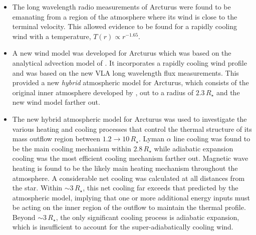 \begin{itemize}
	\item The long wavelength radio measurements of Arcturus were found to be emanating from a region of the atmosphere where its wind is close to the terminal velocity. This allowed evidence to be found for a rapidly cooling wind with a temperature, $T(r) \propto r^{−1.65}$.
	
	\item A new wind model was developed for Arcturus which was based on the analytical advection model of \cite{glassgold_1986}. It incorporates a rapidly cooling wind profile and was based on the new VLA long wavelength flux measurements. This provided a new \textit{hybrid} atmospheric model for Arcturus, which consists of the original inner atmosphere developed by \cite{drake_1985}, out to a radius of $2.3\,R_{\star}$ and the new wind model farther out.

	\item The new hybrid atmospheric model for Arcturus was used to investigate the various heating and cooling processes that control the thermal structure of its mass outflow region between $1.2\rightarrow  10\,R_{\star}$. Lyman $\alpha$ line cooling was found to be the main cooling mechanism within $2.8\,R_{\star}$ while adiabatic expansion cooling was the most efficient cooling mechanism farther out. Magnetic wave heating is found to be the likely main heating mechanism throughout the atmosphere. A considerable net cooling was calculated at all distances from the star. Within $\sim 3\,R_{\star}$, this net cooling far exceeds that predicted by the atmospheric model, implying that one or more additional energy inputs must be acting on the inner region of the outflow to maintain the thermal profile. Beyond $\sim 3\,R_{\star}$, the only significant cooling process is adiabatic expansion, which is insufficient to account for the super-adiabatically cooling wind.

\end{itemize}

